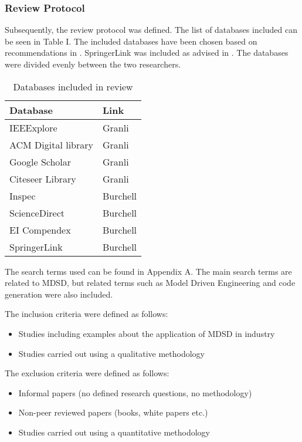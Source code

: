 \documentclass[10pt,twocolumn]{article}
\begin{document}
\subsubsection{Review Protocol}
Subsequently, the review protocol was defined. The list of databases included can be seen in Table I. The included databases have been chosen based on recommendations in \cite{brereton2007lessons}. SpringerLink was included as advised in \cite{kitchenham2007guidelines}. The databases were divided evenly between the two researchers. 

\begin{table}[ht]
	\centering
	\begin{tabular}{|l|l|} 
		\hline
		\textbf{Database} & \textbf{Link}  \\
		\hline
		IEEExplore &  Granli \\
		\hline
		ACM Digital library &  Granli \\
		\hline
		Google Scholar &  Granli \\
		\hline
		Citeseer Library & Granli \\
		\hline
		Inspec &  Burchell \\
		\hline
		ScienceDirect & Burchell \\
		\hline
		EI Compendex &  Burchell \\
		\hline
		SpringerLink & Burchell \\
		\hline
	\end{tabular}
	\caption{Databases included in review}
\end{table}

The search terms used can be found in Appendix A. The main search terms are related to MDSD, but related terms such as Model Driven Engineering and code generation were also included. 

The inclusion criteria were defined as follows: \newline
\begin{itemize} 
\item Studies including examples about the application of MDSD in industry
\item Studies carried out using a qualitative methodology
\end{itemize}

The exclusion criteria were defined as follows: \newline
\begin{itemize}
\item Informal papers (no defined research questions, no methodology)
\item Non-peer reviewed papers (books, white papers etc.)
\item Studies carried out using a quantitative methodology
\end{itemize} 
\end{document}
